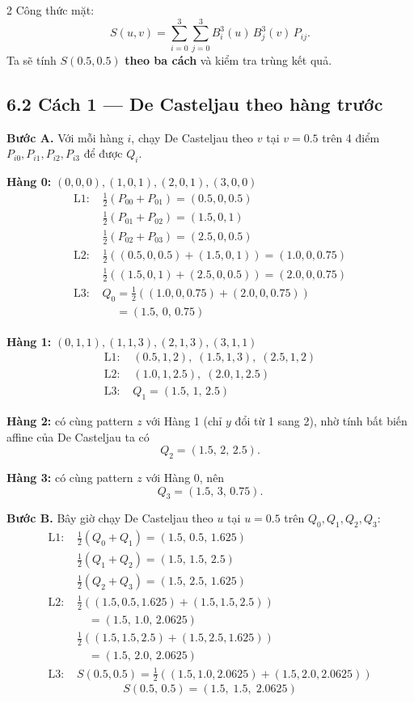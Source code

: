 \begin{paracol}{2}
Công thức mặt:
\[
S(u,v)=\sum_{i=0}^{3}\sum_{j=0}^{3} B_i^3(u)\,B_j^3(v)\,P_{ij}.
\]
Ta sẽ tính $S(0.5,0.5)$ \textbf{theo ba cách} và kiểm tra trùng kết quả.

\subsection*{6.2 Cách 1 --- De Casteljau theo hàng trước}

\textbf{Bước A.} Với mỗi hàng $i$, chạy De Casteljau theo $v$ tại $v=0.5$ trên 4 điểm $P_{i0},P_{i1},P_{i2},P_{i3}$ để được $Q_i$.

\textbf{Hàng 0:} $(0,0,0),(1,0,1),(2,0,1),(3,0,0)$
\begin{align*}
\text{L1: }& \tfrac{1}{2}(P_{00}{+}P_{01})=(0.5,0,0.5)\\
           & \tfrac{1}{2}(P_{01}{+}P_{02})=(1.5,0,1)\\
           & \tfrac{1}{2}(P_{02}{+}P_{03})=(2.5,0,0.5)\\
\text{L2: }& \tfrac{1}{2}((0.5,0,0.5){+}(1.5,0,1))=(1.0,0,0.75)\\
           & \tfrac{1}{2}((1.5,0,1){+}(2.5,0,0.5))=(2.0,0,0.75)\\
\text{L3: }& Q_0=\tfrac{1}{2}((1.0,0,0.75){+}(2.0,0,0.75))\\
           &\phantom{Q_0}=(1.5,\,0,\,0.75)
\end{align*}

\textbf{Hàng 1:} $(0,1,1),(1,1,3),(2,1,3),(3,1,1)$
\begin{align*}
\text{L1: }& (0.5,1,2),\;(1.5,1,3),\;(2.5,1,2)\\
\text{L2: }& (1.0,1,2.5),\;(2.0,1,2.5)\\
\text{L3: }& Q_1=(1.5,\,1,\,2.5)
\end{align*}

\textbf{Hàng 2:} có cùng pattern $z$ với Hàng 1 (chỉ $y$ đổi từ 1 sang 2), nhờ tính bất biến affine của De Casteljau ta có
\[
Q_2=(1.5,\,2,\,2.5).
\]

\textbf{Hàng 3:} có cùng pattern $z$ với Hàng 0, nên
\[
Q_3=(1.5,\,3,\,0.75).
\]

\textbf{Bước B.} Bây giờ chạy De Casteljau theo $u$ tại $u=0.5$ trên $Q_0,Q_1,Q_2,Q_3$:
\begin{align*}
\text{L1: }& \tfrac{1}{2}(Q_0{+}Q_1)=(1.5,\,0.5,\,1.625)\\
           & \tfrac{1}{2}(Q_1{+}Q_2)=(1.5,\,1.5,\,2.5)\\
           & \tfrac{1}{2}(Q_2{+}Q_3)=(1.5,\,2.5,\,1.625)\\
\text{L2: }& \tfrac{1}{2}((1.5,0.5,1.625){+}(1.5,1.5,2.5))\\
           &\quad =(1.5,\,1.0,\,2.0625)\\
           & \tfrac{1}{2}((1.5,1.5,2.5){+}(1.5,2.5,1.625))\\
           &\quad =(1.5,\,2.0,\,2.0625)\\
\text{L3: }& S(0.5,0.5)=\tfrac{1}{2}((1.5,1.0,2.0625){+}(1.5,2.0,2.0625))
\end{align*}
\[
\boxed{\,S(0.5,\,0.5)=(1.5,\;1.5,\;2.0625)\,}
\]


\end{paracol}
